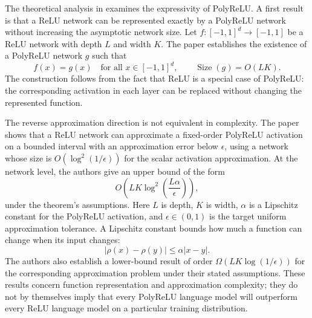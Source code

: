 The theoretical analysis in \textcite{zhuo2025polycom} examines the
expressivity of PolyReLU. A first result is that a ReLU network can
be represented exactly by a PolyReLU network without increasing the
asymptotic network size. Let
\(f:[-1,1]^d\rightarrow[-1,1]\) be a ReLU network with depth \(L\)
and width \(K\). The paper establishes the existence of a PolyReLU
network \(g\) such that
\begin{equation}
    f(x)=g(x)
    \quad\text{for all }x\in[-1,1]^d,
    \qquad
    \operatorname{Size}(g)=O(LK).
    \label{eq:act-polyrelu-exact}
\end{equation}
The construction follows from the fact that ReLU is a special case
of PolyReLU: the corresponding activation in each layer can be
replaced without changing the represented function.

The reverse approximation direction is not equivalent in complexity.
The paper shows that a ReLU network can approximate a fixed-order
PolyReLU activation on a bounded interval with an approximation
error below \(\epsilon\), using a network whose size is
\(O(\log^2(1/\epsilon))\) for the scalar activation approximation.
At the network level, the authors give an upper bound of the form
\begin{equation}
    O\left(
        LK\log^2\left(\frac{L\alpha}{\epsilon}\right)
    \right),
    \label{eq:act-polyrelu-relu-upper}
\end{equation}
under the theorem's assumptions. Here \(L\) is depth, \(K\) is width,
\(\alpha\) is a Lipschitz constant for the PolyReLU activation, and
\(\epsilon\in(0,1)\) is the target uniform approximation tolerance.
A Lipschitz constant bounds how much a function can change when its
input changes:
\begin{equation}
    |\rho(x)-\rho(y)|
    \leq \alpha|x-y|.
    \label{eq:act-lipschitz}
\end{equation}
The authors also establish a lower-bound result of order
\(\Omega(LK\log(1/\epsilon))\) for the corresponding approximation
problem under their stated assumptions. These results concern
function representation and approximation complexity; they do not
by themselves imply that every PolyReLU language model will outperform
every ReLU language model on a particular training distribution.

